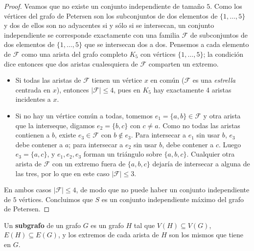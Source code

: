 \begin{proof}
    Veamos que no existe un conjunto independiente de tamaño \( 5 \). Como los vértices del grafo de Petersen son los subconjuntos de dos elementos de \( \{1,\ldots,5\} \) y dos de ellos son no adyacentes si y sólo si se intersecan, un conjunto independiente se corresponde exactamente con una familia \( \mathcal{F} \) de subconjuntos de dos elementos de \( \{1,\ldots,5\} \) que se intersecan dos a dos. Pensemos a cada elemento de \( \mathcal{F} \) como una arista del grafo completo \( K_5 \) con vértices \( \{1,\ldots,5\} \); la condición dice entonces que dos aristas cualesquiera de \( \mathcal{F} \) comparten un extremo.

    \begin{itemize}
        \item Si todas las aristas de \( \mathcal{F} \) tienen un vértice \( x \) en común (\( \mathcal{F} \) es una \emph{estrella} centrada en \( x \)), entonces \( |\mathcal{F}| \leq 4 \), pues en \( K_5 \) hay exactamente 4 aristas incidentes a \( x \).
        \item Si no hay un vértice común a todas, tomemos \( e_1 = \{a,b\} \in \mathcal{F} \) y otra arista que la interseque, digamos \( e_2 = \{b,c\} \) con \( c \neq a \). Como no todas las aristas contienen a \( b \), existe \( e_3 \in \mathcal{F} \) con \( b \notin e_3 \). Para intersecar a \( e_1 \) sin usar \( b \), \( e_3 \) debe contener a \( a \); para intersecar a \( e_2 \) sin usar \( b \), debe contener a \( c \). Luego \( e_3 = \{a,c\} \), y \( e_1, e_2, e_3 \) forman un triángulo sobre \( \{a,b,c\} \). Cualquier otra arista de \( \mathcal{F} \) con un extremo fuera de \( \{a,b,c\} \) dejaría de intersecar a alguna de las tres, por lo que en este caso \( |\mathcal{F}| \leq 3 \).
    \end{itemize}

    En ambos casos \( |\mathcal{F}| \leq 4 \), de modo que no puede haber un conjunto independiente de \( 5 \) vértices. Concluimos que \( S \) es un conjunto independiente máximo del grafo de Petersen.
\end{proof}

\vspace{0.5cm}

\begin{definition}
    Un \textbf{subgrafo} de un grafo \( G \) es un grafo \( H \) tal que \( V(H) \subseteq V(G) \), \( E(H) \subseteq E(G) \), y los extremos de cada arista de \( H \) son los mismos que tiene en \( G \).
\end{definition}

